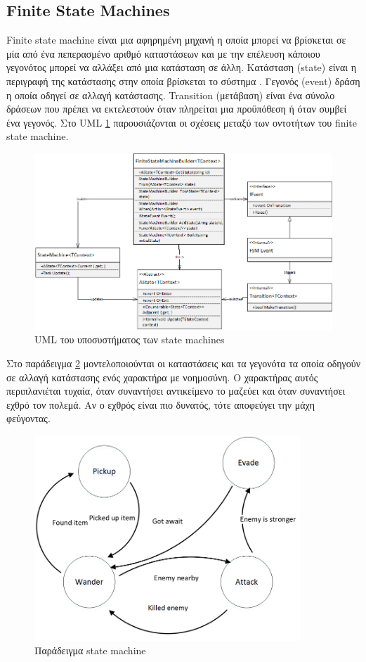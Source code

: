 \subsection{Finite State Machines}	
 Finite state machine είναι μια αφηρημένη μηχανή η οποία μπορεί να βρίσκεται σε μία από ένα πεπερασμένο αριθμό καταστάσεων και με την επέλευση κάποιου γεγονότος μπορεί να αλλάξει από μια κατάσταση σε άλλη. 
 Κατάσταση (state) είναι η περιγραφή της κατάστασης στην οποία βρίσκεται το σύστημα \cite{gill1962introduction}.
 Γεγονός (event) δράση η οποία οδηγεί σε αλλαγή κατάστασης.
 Transition (μετάβαση) είναι ένα σύνολο δράσεων που πρέπει να εκτελεστούν όταν πληρείται μια προϋπόθεση ή όταν συμβεί ένα γεγονός. Στο \gls{UML} \ref{fig:state_machine_uml} παρουσιάζονται οι σχέσεις μεταξύ των οντοτήτων του finite state machine.
 
\begin{figure}[h!]
	\centering
	\includegraphics[width=165mm]{Images/state_machine_uml}
	\caption{UML του υποσυστήματος των state machines }
	\label{fig:state_machine_uml}
\end{figure}	

Στο παράδειγμα \ref{fig:state_machine_example} μοντελοποιούνται οι καταστάσεις και τα γεγονότα τα οποία οδηγούν σε αλλαγή κατάστασης ενός χαρακτήρα με νοημοσύνη. Ο χαρακτήρας αυτός περιπλανιέται τυχαία, όταν συναντήσει αντικείμενο το μαζεύει και όταν συναντήσει εχθρό τον πολεμά. Αν ο εχθρός είναι πιο δυνατός, τότε αποφεύγει την μάχη φεύγοντας.
\begin{figure}[h!]
	\centering
	\includegraphics[width=100mm]{Images/ingame_fsm_example}
	\caption{Παράδειγμα state machine}
	\label{fig:state_machine_example}
\end{figure}

